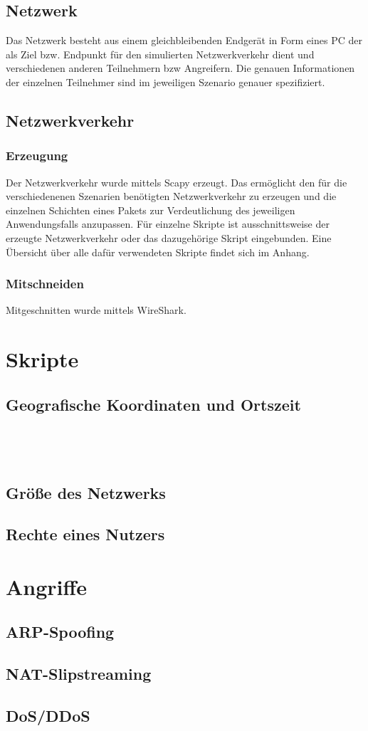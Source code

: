 \subsection{Netzwerk}
Das Netzwerk besteht aus einem gleichbleibenden Endgerät in Form eines PC der als Ziel bzw. Endpunkt für den simulierten Netzwerkverkehr dient und verschiedenen anderen Teilnehmern bzw Angreifern. Die genauen Informationen der einzelnen Teilnehmer sind im jeweiligen Szenario genauer spezifiziert.
\subsection{Netzwerkverkehr}
\subsubsection{Erzeugung}
Der Netzwerkverkehr wurde mittels Scapy erzeugt. Das ermöglicht den für die verschiedenenen Szenarien benötigten Netzwerkverkehr zu erzeugen und die einzelnen Schichten eines Pakets zur Verdeutlichung des jeweiligen Anwendungsfalls anzupassen. Für einzelne Skripte ist ausschnittsweise der erzeugte Netzwerkverkehr oder das dazugehörige Skript eingebunden. Eine Übersicht über alle dafür verwendeten Skripte findet sich im Anhang.
\subsubsection{Mitschneiden}
Mitgeschnitten wurde mittels WireShark.

\section{Skripte}
\subsection{Geografische Koordinaten und Ortszeit}

\inputminted{python}{geolocation_packets.py}\\
\inputminted{zeek}{geolocation.zeek}
\subsection{Größe des Netzwerks}

\subsection{Rechte eines Nutzers}

\section{Angriffe}
\subsection{ARP-Spoofing}
\subsection{NAT-Slipstreaming}
\subsection{DoS/DDoS}
\subsection{}